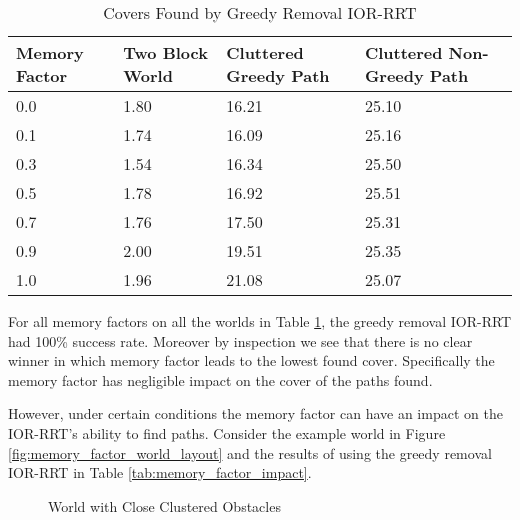 \begin{table}[h!]
\centering
\begin{tabular}{@{}llll@{}}
\toprule
Memory Factor & Two Block World  & Cluttered Greedy Path  & Cluttered Non-Greedy Path \\ 
\midrule
0.0 & 1.80 & 16.21 & 25.10 \\
0.1 & 1.74 & 16.09 & 25.16 \\
0.3 & 1.54 & 16.34 & 25.50 \\
0.5 & 1.78 & 16.92 & 25.51 \\
0.7 & 1.76 & 17.50 & 25.31 \\
0.9 & 2.00 & 19.51 & 25.35 \\ 
1.0 & 1.96 & 21.08 & 25.07 \\
\bottomrule
\end{tabular}
\caption{Covers Found by Greedy Removal IOR-RRT}
\label{tab:memory_factor_no_impact}
\end{table}

For all memory factors on all the worlds in Table \ref{tab:memory_factor_no_impact}, the greedy removal IOR-RRT had 100\% success rate. Moreover by inspection we see that there is no clear winner in which memory factor leads to the lowest found cover. Specifically the memory factor has negligible impact on the cover of the paths found. 

However, under certain conditions the memory factor can have an impact on the IOR-RRT's ability to find paths. Consider the example world in Figure \ref{fig:memory_factor_world_layout} and the results of using the greedy removal IOR-RRT in Table \ref{tab:memory_factor_impact}.

\begin{figure}[!h]
    \hfill
    \caption{World with Close Clustered Obstacles}
    \label{fig:memory_factor_world}
\end{figure}


